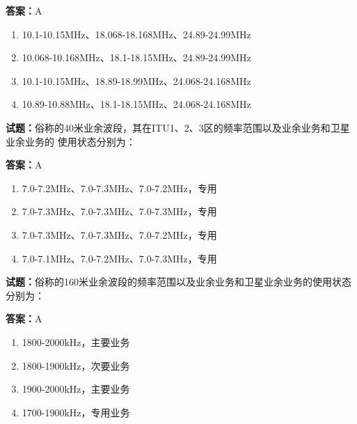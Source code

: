 \documentclass{ctexbook}
\begin{document}
\textbf{答案：}A 

\begin{enumerate}[leftmargin=3em]
  \item 10.1-10.15MHz、18.068-18.168MHz、24.89-24.99MHz 

  \item 10.068-10.168MHz、18.1-18.15MHz、24.89-24.99MHz 

  \item 10.1-10.15MHz、18.89-18.99MHz、24.068-24.168MHz 

  \item 10.89-10.88MHz、18.1-18.15MHz、24.068-24.168MHz 

\end{enumerate}





\vspace{1em}

\textbf{试题：}俗称的40米业余波段，其在ITU1、2、3区的频率范围以及业余业务和卫星业余业务的
使用状态分别为： 


\textbf{答案：}A 

\begin{enumerate}[leftmargin=3em]
  \item 7.0-7.2MHz、7.0-7.3MHz、7.0-7.2MHz，专用 

  \item 7.0-7.3MHz、7.0-7.3MHz、7.0-7.3MHz，专用 

  \item 7.0-7.3MHz、7.0-7.3MHz、7.0-7.2MHz，专用 

  \item 7.0-7.1MHz、7.0-7.2MHz、7.0-7.3MHz，专用 

\end{enumerate}





\vspace{1em}

\textbf{试题：}俗称的160米业余波段的频率范围以及业余业务和卫星业余业务的使用状态分别为： 

\textbf{答案：}A 

\begin{enumerate}[leftmargin=3em]
  \item 1800-2000kHz，主要业务 

  \item 1800-1900kHz，次要业务 

  \item 1900-2000kHz，主要业务 

  \item 1700-1900kHz，专用业务 

\end{enumerate}
\end{document}
